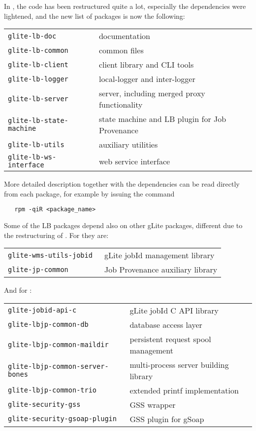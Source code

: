 In \LBnew, the code has been restructured quite a lot, especially the dependencies were lightened,
and the new list of packages is now the following:

\begin{tabularx}{\textwidth}{>{\tt}lX}
glite-lb-doc & documentation \\ 
glite-lb-common & common files \\ 
glite-lb-client & client library and CLI tools\\ 
glite-lb-logger & local-logger and inter-logger \\
glite-lb-server & server, including merged proxy functionality \\
glite-lb-state-machine & state machine and LB plugin for Job Provenance \\ 
glite-lb-utils & auxiliary utilities \\
glite-lb-ws-interface & web service interface \\
\end{tabularx}

More detailed description together with the dependencies can be read directly from each package,
for example by issuing the command 
\begin{verbatim}
   rpm -qiR <package_name>
\end{verbatim}

Some of the LB packages depend also on other gLite packages, different 
due to the restructuring of \LBnew.
For \LBold they are:


\begin{tabularx}{\textwidth}{>{\tt}lX}
glite-wms-utils-jobid & gLite jobId management library \\
glite-jp-common & Job Provenance auxiliary library \\ 
\end{tabularx}

\noindent
And for \LBnew:

\begin{tabularx}{\textwidth}{>{\tt}lX}
glite-jobid-api-c & gLite jobId C API library \\ 
glite-lbjp-common-db & database access layer \\
glite-lbjp-common-maildir & persistent request spool management \\
glite-lbjp-common-server-bones & multi-process server building library \\
glite-lbjp-common-trio & extended printf implementation \\
glite-security-gss & GSS wrapper \\
glite-security-gsoap-plugin & GSS plugin for gSoap \\
\end{tabularx}

